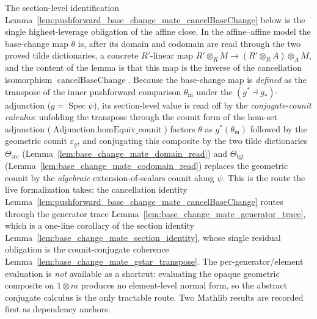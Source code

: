 The section-level identification
Lemma~\ref{lem:pushforward_base_change_mate_cancelBaseChange} below is the single
highest-leverage obligation of the affine close. In the affine--affine model the
base-change map \(\theta\) is, after its domain and codomain are read through the two
proved tilde dictionaries, a concrete \(R'\)-linear map
\(R' \otimes_R M \to (R' \otimes_R A) \otimes_A M\), and the content of the lemma is
that this map is the inverse of the cancellation isomorphism
\(\operatorname{cancelBaseChange}\). Because the base-change map is \emph{defined} as the
transpose of the inner pushforward comparison \(\theta_{\mathrm{in}}\) under the
\((g^* \dashv g_*)\)-adjunction (\(g = \operatorname{Spec}\psi\)), its section-level value
is read off by the \emph{conjugate-counit calculus}: unfolding the transpose through the
counit form of the hom-set adjunction
(\(\operatorname{Adjunction.homEquiv\_counit}\)) factors \(\theta\) as
\(g^*(\theta_{\mathrm{in}})\) followed by the geometric counit \(\varepsilon_g\), and
conjugating this composite by the two tilde dictionaries
\(\Theta_{\mathrm{src}}\) (Lemma~\ref{lem:base_change_mate_domain_read}) and
\(\Theta_{\mathrm{tgt}}\) (Lemma~\ref{lem:base_change_mate_codomain_read}) replaces the
geometric counit by the \emph{algebraic} extension-of-scalars counit along \(\psi\). This
is the route the live formalization takes: the cancellation identity
Lemma~\ref{lem:pushforward_base_change_mate_cancelBaseChange} routes through the generator
trace Lemma~\ref{lem:base_change_mate_generator_trace}, which is a one-line corollary of the
section identity Lemma~\ref{lem:base_change_mate_section_identity}, whose single residual
obligation is the counit-conjugate coherence Lemma~\ref{lem:base_change_mate_gstar_transpose}.
The per-generator/element evaluation is \emph{not} available as a shortcut: evaluating the
opaque geometric composite on \(1 \otimes m\) produces no element-level normal form, so the
abstract conjugate calculus is the only tractable route. Two Mathlib results are recorded
first as dependency anchors.






